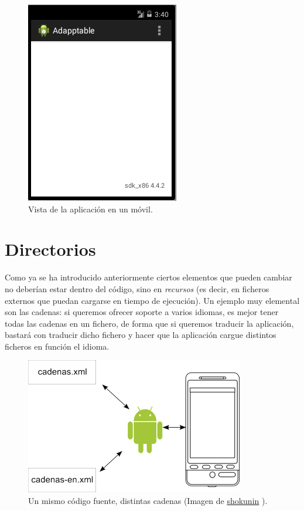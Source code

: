 \documentclass[a4paper,12pt,spanish]{sphinxmanual}
\begin{document}
\begin{figure}[htbp]
\centering
\capstart

\includegraphics{distintostamanios2.png}
\caption{Vista de la aplicación en un móvil.}\end{figure}


\section{Directorios}
\label{tema1:id1}
Como ya se ha introducido anteriormente ciertos elementos que pueden cambiar no deberían estar dentro del código, sino en \emph{recursos} (es decir, en ficheros externos que puedan cargarse en tiempo de ejecución). Un ejemplo muy elemental son las cadenas: si queremos ofrecer soporte a varios idiomas, es mejor tener todas las cadenas en un fichero, de forma que si queremos traducir la aplicación, bastará con traducir dicho fichero y hacer que la aplicación cargue distintos ficheros en función el idioma.
\begin{figure}[htbp]
\centering
\capstart

\includegraphics{cadenasmultiples.png}
\caption{Un mismo código fuente, distintas cadenas (Imagen de \href{http://openclipart.org/user-detail/shokunin}{shokunin} ).}\end{figure}
\end{document}

